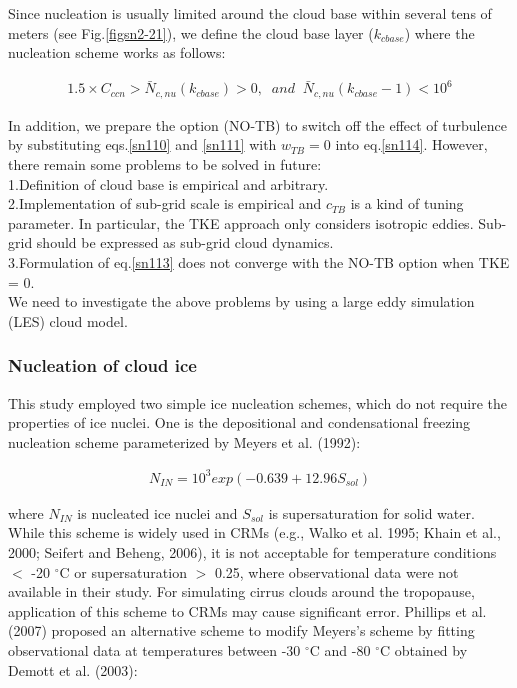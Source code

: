 Since nucleation is usually limited around the cloud base within several tens of meters (see Fig.\ref{figsn2-21}), we define the cloud base layer ($k_{cbase}$) where the nucleation scheme works as follows:

\begin{eqnarray}
1.5 \times C_{ccn} > \bar{N}_{c,nu}(k_{cbase})>0,\;\;and\;\;\bar{N}_{c,nu}(k_{cbase}-1) < 10^{6}\label{sn116}
\end{eqnarray}

In addition, we prepare the option (NO-TB) to switch off the effect of turbulence by substituting eqs.\ref{sn110} and \ref{sn111} with $w_{TB} = 0$ into eq.\ref{sn114}. However, there remain some problems to be solved in future:\\
1.Definition of cloud base is empirical and arbitrary.\\
2.Implementation of sub-grid scale is empirical and $c_{TB}$ is a kind of tuning parameter. In particular, the TKE approach only considers isotropic eddies. Sub-grid should be expressed as sub-grid cloud dynamics.\\
3.Formulation of eq.\ref{sn113} does not converge with the NO-TB option when TKE = 0.\\
We need to investigate the above problems by using a large eddy simulation (LES) cloud model.

\subsubsection{Nucleation of cloud ice}
This study employed two simple ice nucleation schemes, which do not require the properties of ice nuclei. One is the depositional and condensational freezing nucleation scheme parameterized by Meyers et al. (1992):

\begin{eqnarray}
N_{IN}=10^{3}exp(-0.639+12.96S_{sol})\nonumber
\end{eqnarray}

where $N_{IN}$ is nucleated ice nuclei and $S_{sol}$ is supersaturation for solid water. While this scheme is widely used in CRMs (e.g., Walko et al. 1995; Khain et al., 2000; Seifert and Beheng, 2006), it is not acceptable for temperature conditions $<$ -20 $^\circ$C or supersaturation $>$ 0.25, where observational data were not available in their study. For simulating cirrus clouds around the tropopause, application of this scheme to CRMs may cause significant error. Phillips et al. (2007) proposed an alternative scheme to modify Meyers’s scheme by fitting observational data at temperatures between -30 $^\circ$C and -80 $^\circ$C obtained by Demott et al. (2003):

